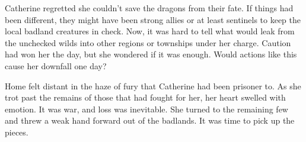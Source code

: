 \begin{multicols*}{2}
Catherine regretted she couldn't save the dragons from their fate. If things had been different, they might have been strong allies or at least sentinels to keep the local badland creatures in check. Now, it was hard to tell what would leak from the unchecked wilds into other regions or townships under her charge. Caution had won her the day, but she wondered if it was enough. Would actions like this cause her downfall one day?

Home felt distant in the haze of fury that Catherine had been prisoner to. As she trot past the remains of those that had fought for her, her heart swelled with emotion. It was war, and loss was inevitable. She turned to the remaining few and threw a weak hand forward out of the badlands. It was time to pick up the pieces.

\end{multicols*}
